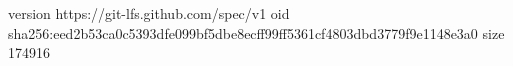 version https://git-lfs.github.com/spec/v1
oid sha256:eed2b53ca0c5393dfe099bf5dbe8ecff99ff5361cf4803dbd3779f9e1148e3a0
size 174916
